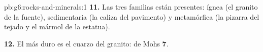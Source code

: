 \begin{solution}{pb:g6:rocks-and-minerals:1}
\textbf{11.} Las tres familias están presentes: ígnea (el granito de la
fuente), sedimentaria (la caliza del pavimento) y metamórfica (la pizarra
del tejado y el mármol de la estatua).

\textbf{12.} El  más duro es el cuarzo del granito:  de Mohs
\textbf{7}.
\end{solution}
